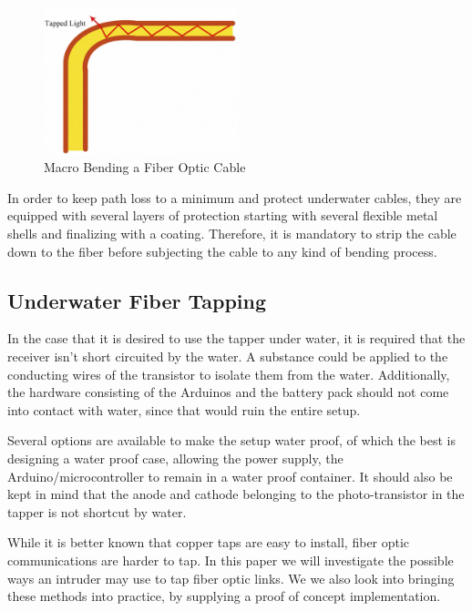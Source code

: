 \documentclass[11pt,twoside,a4paper]{scrartcl}
\begin{document}
		\begin{figure}[htbp]
			\centering
			\includegraphics[width=0.5\textwidth]{bending}
			\caption{Macro Bending a Fiber Optic Cable}
			\label{fig:bending}
		\end{figure}

		In order to keep path loss to a minimum and protect underwater cables,
		they are equipped with several layers of protection starting with several flexible metal shells and finalizing with a coating.
		Therefore, it is mandatory to strip the cable down to the fiber before subjecting the cable to any kind of bending process. 

	\subsection{Underwater Fiber Tapping}
		In the case that it is desired to use the tapper under water, it is required that the receiver isn't short circuited by the water.
		A substance could be applied to the conducting wires of the transistor to isolate them from the water. 
		Additionally, the hardware consisting of the Arduinos and the battery pack should not come into contact with water,
		since that would ruin the entire setup. 

		Several options are available to make the setup water proof, of which the best is designing a water proof case, allowing the power supply,
		the Arduino/microcontroller to remain in a water proof container.
		It should also be kept in mind that the anode and cathode belonging to the photo-transistor in the tapper is not shortcut by water.

		While it is better known that copper taps are easy to install, fiber optic communications are harder to tap.
		In this paper we will investigate the possible ways an intruder may use to tap fiber optic links.
		We we also look into bringing these methods into practice, by supplying a proof of concept implementation.
\end{document}
